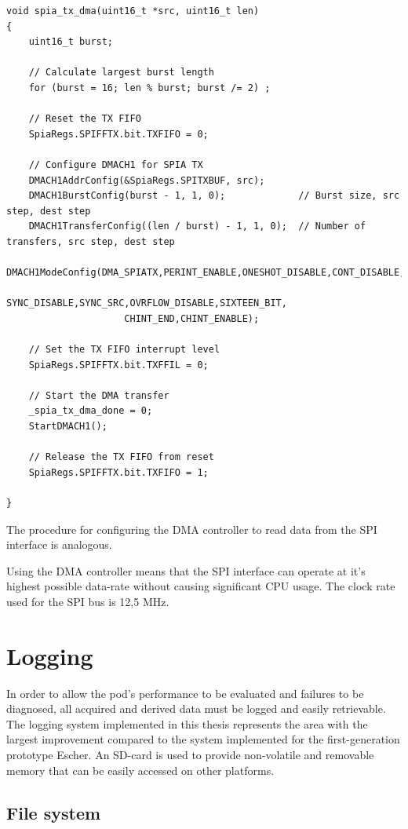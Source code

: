 \begin{verbatim}
void spia_tx_dma(uint16_t *src, uint16_t len)
{
    uint16_t burst;

    // Calculate largest burst length
    for (burst = 16; len % burst; burst /= 2) ;

    // Reset the TX FIFO
    SpiaRegs.SPIFFTX.bit.TXFIFO = 0;

    // Configure DMACH1 for SPIA TX
    DMACH1AddrConfig(&SpiaRegs.SPITXBUF, src);
    DMACH1BurstConfig(burst - 1, 1, 0);             // Burst size, src step, dest step
    DMACH1TransferConfig((len / burst) - 1, 1, 0);  // Number of transfers, src step, dest step
    DMACH1ModeConfig(DMA_SPIATX,PERINT_ENABLE,ONESHOT_DISABLE,CONT_DISABLE,
                     SYNC_DISABLE,SYNC_SRC,OVRFLOW_DISABLE,SIXTEEN_BIT,
                     CHINT_END,CHINT_ENABLE);

    // Set the TX FIFO interrupt level
    SpiaRegs.SPIFFTX.bit.TXFFIL = 0;

    // Start the DMA transfer
    _spia_tx_dma_done = 0;
    StartDMACH1();

    // Release the TX FIFO from reset
    SpiaRegs.SPIFFTX.bit.TXFIFO = 1;

}
\end{verbatim}

The procedure for configuring the DMA controller to read data from the SPI interface is analogous.

Using the DMA controller means that the SPI interface can operate at it's highest possible data-rate without causing significant CPU usage. The clock rate used for the SPI bus is 12,5 MHz.

\section{Logging} \label{logging}

In order to allow the pod's performance to be evaluated and failures to be diagnosed, all acquired and derived data must be logged and easily retrievable. The logging system implemented in this thesis represents the area with the largest improvement compared to the system implemented for the first-generation prototype Escher. An SD-card is used to provide non-volatile and removable memory that can be easily accessed on other platforms.

\subsection{File system}

